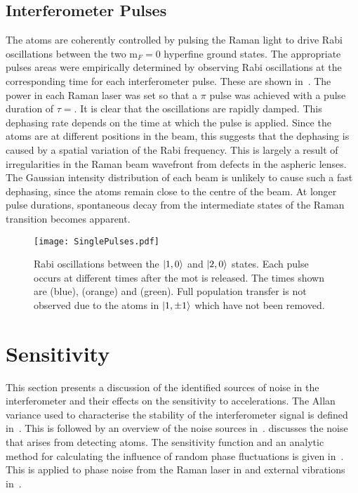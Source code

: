 \subsection{Interferometer Pulses}\label{subsec:int_pulses}
The atoms are coherently controlled by pulsing the Raman
light to drive Rabi oscillations between the two m\(_F = 0\)
hyperfine ground states. The appropriate pulses areas were empirically
determined by observing Rabi oscillations at the corresponding time
for each interferometer pulse. These are shown
in~. The power in each Raman laser was
set so that a \(\pi\) pulse was achieved with a pulse duration of
\(\tau = \). It is clear that the oscillations
are rapidly damped. This dephasing rate depends on the
time at which the pulse is applied. Since the atoms are at different
positions in the beam, this suggests that the dephasing is caused by a
spatial variation of the Rabi frequency. This is largely a result of
irregularities in the Raman beam wavefront from defects in
the aspheric lenses. The Gaussian intensity distribution of each beam
is unlikely to cause such a fast dephasing, since the atoms remain
close to the centre of the beam. At longer pulse durations,
spontaneous decay from the intermediate states of the Raman transition
becomes apparent.
\begin{figure}[htpb]
  \centering
  \texttt{[image: SinglePulses.pdf]}
  \caption[Rabi oscillations between the $\ket{1,0}$ and $\ket{2,0}$
    states.]{Rabi oscillations between the $\ket{1,0}$ and $\ket{2,0}$
    states. Each pulse occurs at different times after the \ac{mot} is
    released. The times shown are  (blue),
   (orange) and  (green). Full
  population transfer is not observed due to the atoms in $\ket{1,\pm
1}$ which have not been removed. }
\label{fig:rabi_oscillation}
\end{figure}
\section{Sensitivity}\label{sec:atomint_sensitivity}
This section presents a discussion of the identified sources of
noise in the interferometer and their effects on the sensitivity to
accelerations. The Allan variance used to characterise
the stability of the interferometer signal is defined
in~. This is followed by an overview
of the noise sources in~.
 discusses the noise that arises
from detecting atoms. The sensitivity function and an analytic method
for calculating the influence of random phase fluctuations is given
in~. This is applied to phase noise from
the Raman laser in  and external
vibrations in~.
